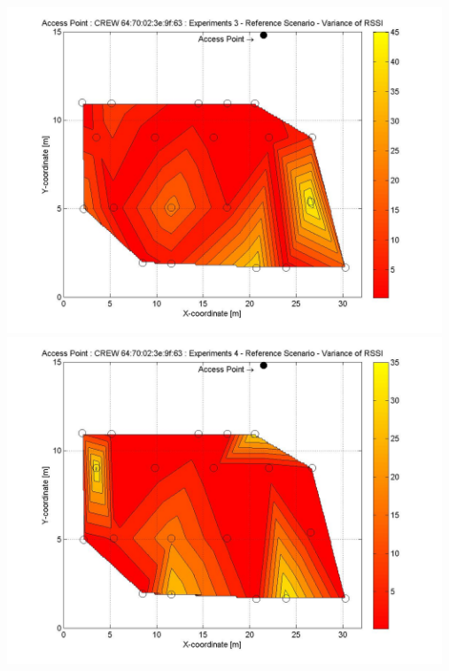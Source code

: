 \documentclass[11pt,a4paper,headinclude,footinclude,chapterprefix=on]{scrreprt}
\begin{document}
\begin{longtable}
	\includegraphics[width=13cm]{../../Source/plot/CREW_63/63_Ref_Ex_3_Variance.jpg} \\
	\includegraphics[width=13cm]{../../Source/plot/CREW_63/63_Ref_Ex_4_Variance.jpg} 
\end{longtable}
\end{document}
